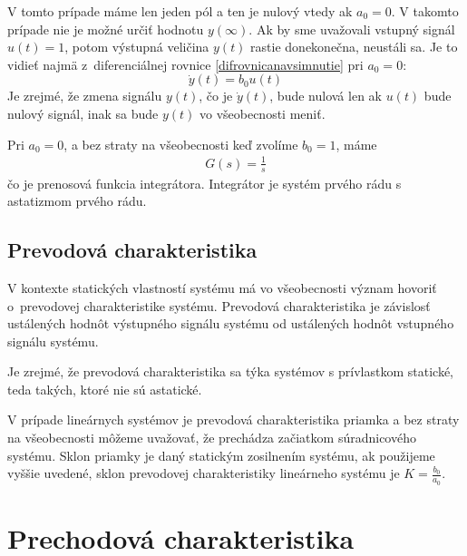 \documentclass[a4paper, 10pt, ]{article}
\begin{document}
V tomto prípade máme len jeden pól a ten je nulový vtedy ak $a_0 = 0$. V takomto prípade nie je možné určiť hodnotu $y(\infty)$. Ak by sme uvažovali vstupný signál $u(t) = 1$, potom výstupná veličina $y(t)$ rastie donekonečna, neustáli sa. Je to vidieť najmä z~diferenciálnej rovnice \eqref{difrovnicanavsimnutie} pri $a_0 = 0$:
\begin{equation}
    \dot y(t) = b_0 u(t)
\end{equation}
Je zrejmé, že zmena signálu $y(t)$, čo je $\dot y(t)$, bude nulová len ak $u(t)$ bude nulový signál, inak sa bude $y(t)$ vo všeobecnosti meniť.

Pri $a_0 = 0$, a bez straty na všeobecnosti keď zvolíme $b_0 = 1$, máme
\begin{align}
    G(s) = \frac{1}{s}
\end{align}
čo je prenosová funkcia integrátora. Integrátor je systém prvého rádu s astatizmom prvého rádu.


\subsection{Prevodová charakteristika}

V kontexte statických vlastností systému má vo všeobecnosti význam hovoriť o~prevodovej charakteristike systému. Prevodová charakteristika je závislosť ustálených hodnôt výstupného signálu systému od ustálených hodnôt vstupného signálu systému.

Je zrejmé, že prevodová charakteristika sa týka systémov s prívlastkom statické, teda takých, ktoré nie sú astatické.

V prípade lineárnych systémov je prevodová charakteristika priamka a bez straty na všeobecnosti môžeme uvažovať, že prechádza začiatkom súradnicového systému. Sklon priamky je daný statickým zosilnením systému, ak použijeme vyššie uvedené, sklon prevodovej charakteristiky lineárneho systému je $K = \frac{b_0}{a_0}$.




\section{Prechodová charakteristika}






\end{document}
